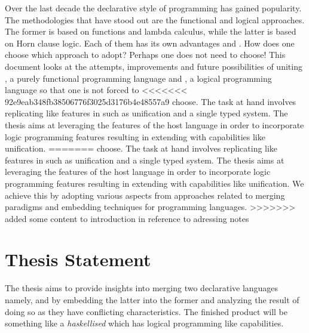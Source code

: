 \documentclass[thesis-solanki.tex]{subfiles}
\begin{document}
Over the last decade the declarative style of programming has gained popularity.
The methodologies that have stood out are the functional and logical approaches.
The former is based on functions and lambda calculus, while the latter is based on Horn clause logic.
Each of them has its own advantages and 
.
How does one choose which approach to adopt?
Perhaps one does not need to choose!
This document looks at the attempts, improvements and future possibilities of uniting , a purely
functional programming language and , a logical programming language so that one is not forced to
<<<<<<< 92e9eab348fb38506776f3025d3176b4e48557a9
choose.
The task at hand involves replicating  like features in  such as unification and
a single typed system.
The thesis aims at leveraging the features of the host language in order to incorporate logic programming features
resulting in extending  with capabilities like unification.
=======
choose. The task at hand involves replicating  like features in  such as unification and a single
typed system. The thesis aims at leveraging the features of the host language in order to incorporate logic programming features resulting in extending 
 with capabilities like unification. We achieve this by adopting various aspects from approaches related to merging 
paradigms and embedding techniques for programming languages.  
>>>>>>> added some content to introduction in reference to adressing notes



\section{Thesis Statement}

The thesis aims to provide insights into merging two declarative languages namely,  and
 by embedding the latter into the former and analyzing the result of doing so as they have conflicting
characteristics.
The finished product will be something like a \textit{haskellised}  which has logical programming like
capabilities.
\end{document}

